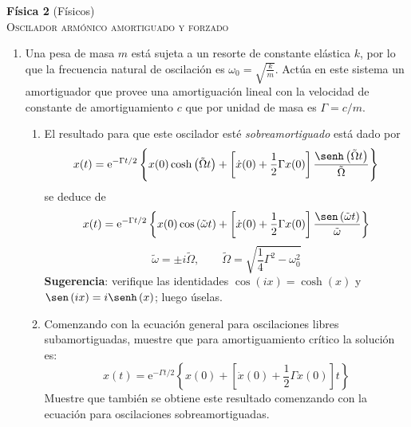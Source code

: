 \documentclass[11pt,spanish,a4paper]{article}
\begin{document}
\begin{center}
\textbf{Física 2} (Físicos) \hfill {}\\
\textsc{\LARGE Oscilador armónico amortiguado y forzado}\\
\end{center}


\begin{enumerate}


\subsection*{Oscilador armónico amortiguado}

\item Una pesa de masa $m$ está sujeta a un resorte de constante elástica $k$, por lo que la frecuencia natural de oscilación es $\omega_0 = \sqrt{ \frac{k}{m} }$.
Actúa en este sistema un amortiguador que provee una amortiguación lineal con la velocidad de constante de amortiguamiento \(c\) que por unidad de masa es $\Gamma= c/m$.
	\begin{enumerate}
	\item El resultado para que este oscilador esté \emph{sobreamortiguado} está dado por
	\[
		x(t) = \operatorname{e}^{-\Gamma t/2} \left\{ x(0) \cosh \left( \tilde{\Omega}  t \right) + \left[ \dot{x}(0) + \frac{1}{2} \Gamma x(0) \right] \frac{ \senh \left( \tilde{\Omega} t \right) }{ \tilde{\Omega} } \right\} 
	\]
	se deduce de
	\[
		x(t) = \operatorname{e}^{-\Gamma t/2} \left\{ x(0) \cos \left( \tilde{\omega} t\right) + \left[ \dot{x}(0) + \frac{1}{2} \Gamma x(0) \right] \frac{ \sen \left( \tilde{\omega} t \right)}{ \tilde{\omega} }\right\} 
	\]
	\[
		\tilde{\omega} = \pm i \tilde{\Omega} ,\qquad \tilde{\Omega} = \sqrt{\frac{1}{4}\Gamma^{2}-\omega_{0}^{2}}
	\]
	\textbf{Sugerencia}: verifique las identidades $\cos\left(ix\right)=\cosh\left(x\right)$ y $\sen\left(ix\right)=i\senh\left(x\right)$; luego úselas.
	\item Comenzando con la ecuación general para oscilaciones libres subamortiguadas, muestre que para amortiguamiento crítico la solución es:
	\[
		x(t)=\mathrm{e}^{-\Gamma t/2}\left\{ x(0)+\left[\dot{x}(0)+\frac{1}{2}\Gamma x(0)\right]t\right\} 
		\]
	Muestre que también se obtiene este resultado comenzando con la ecuación para oscilaciones sobreamortiguadas.
\end{enumerate}




\end{enumerate}
\end{document}
